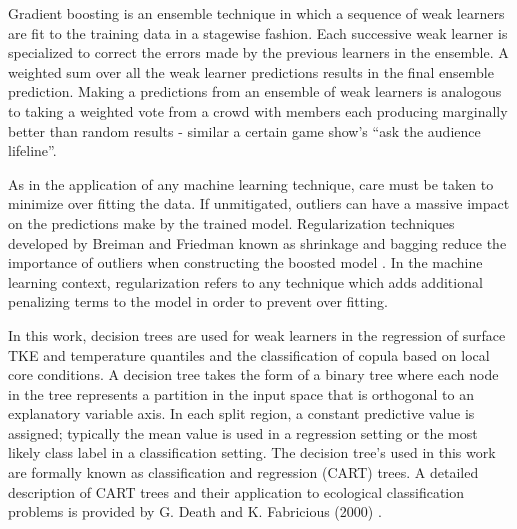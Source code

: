 Gradient boosting is an ensemble technique in which a sequence of weak learners are fit to the training data in a stagewise fashion.  Each successive weak learner is specialized to correct the errors made by the previous learners in the ensemble.  A weighted sum over all the weak learner predictions results in the final ensemble prediction.  Making a predictions from an ensemble of weak learners is analogous to taking a weighted vote from a crowd with members each producing marginally better than random results - similar a certain game show's ``ask the audience lifeline''.  

As in the application of any machine learning technique, care must be taken to minimize over fitting the data.  If unmitigated, outliers can have a massive impact on the predictions make by the trained model.  Regularization techniques developed by Breiman and Friedman known as shrinkage and bagging reduce the importance of outliers when constructing the boosted model \cite{breiman1996}.  In the machine learning context, regularization refers to any technique which adds additional penalizing terms to the model in order to prevent over fitting. 

In this work, decision trees are used for weak learners in the regression of surface TKE and temperature quantiles and the classification of copula based on local core conditions.   A decision tree takes the form of a binary tree where each node in the tree represents a partition in the input space that is orthogonal to an explanatory variable axis.  In each split region, a constant predictive value is assigned; typically the mean value is used in a regression setting or the most likely class label in a classification setting.  The decision tree's used in this work are formally known as classification and regression (CART) trees.  A detailed description of CART trees and their application to ecological classification problems is provided by G. Death and K. Fabricious (2000) \cite{death2000}. 


